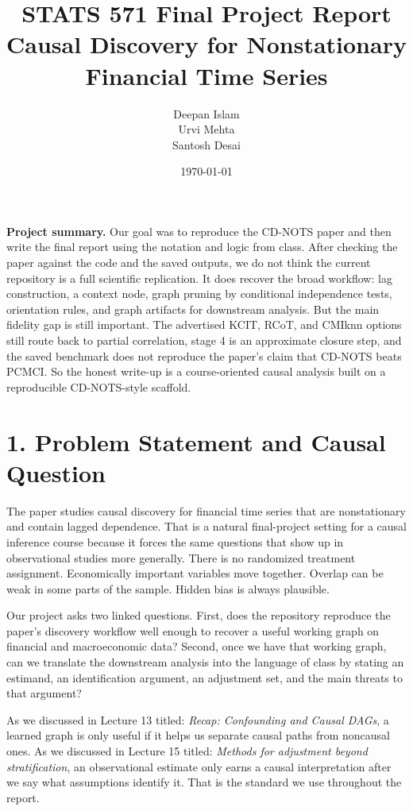 \documentclass[12pt]{article}
\title{STATS 571 Final Project Report\\Causal Discovery for Nonstationary Financial Time Series}
\author{Deepan Islam \\ Urvi Mehta \\ Santosh Desai}
\date{\today}
\begin{document}
\maketitle

\textbf{Project summary.} Our goal was to reproduce the CD-NOTS paper and then write the final
report using the notation and logic from class. After checking the paper against the code and the
saved outputs, we do not think the current repository is a full scientific replication. It does
recover the broad workflow: lag construction, a context node, graph pruning by conditional
independence tests, orientation rules, and graph artifacts for downstream analysis. But the main
fidelity gap is still important. The advertised KCIT, RCoT, and CMIknn options still route back to
partial correlation, stage 4 is an approximate closure step, and the saved benchmark does not
reproduce the paper's claim that CD-NOTS beats PCMCI. So the honest write-up is a course-oriented
causal analysis built on a reproducible CD-NOTS-style scaffold.

\section*{1. Problem Statement and Causal Question}

The paper studies causal discovery for financial time series that are nonstationary and contain
lagged dependence. That is a natural final-project setting for a causal inference course because it
forces the same questions that show up in observational studies more generally. There is no
randomized treatment assignment. Economically important variables move together. Overlap can be weak
in some parts of the sample. Hidden bias is always plausible.

Our project asks two linked questions. First, does the repository reproduce the paper's discovery
workflow well enough to recover a useful working graph on financial and macroeconomic data? Second,
once we have that working graph, can we translate the downstream analysis into the language of class
by stating an estimand, an identification argument, an adjustment set, and the main threats to that
argument?

As we discussed in Lecture 13 titled: \textit{Recap: Confounding and Causal DAGs}, a learned graph
is only useful if it helps us separate causal paths from noncausal ones. As we discussed in Lecture
15 titled: \textit{Methods for adjustment beyond stratification}, an observational estimate only
earns a causal interpretation after we say what assumptions identify it. That is the standard we
use throughout the report.
\end{document}
